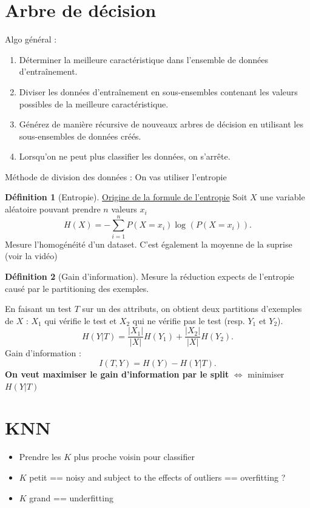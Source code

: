 \documentclass{article}
\theoremstyle{plain}%
\theoremstyle{definition}
\newtheorem{defn}{Définition}[section]
\theoremstyle{remark}
\begin{document}
\section{Arbre de décision}
Algo général : 
\begin{enumerate}
    \item Déterminer la meilleure caractéristique dans l'ensemble de données d'entraînement.
    \item Diviser les données d'entraînement en sous-ensembles contenant les valeurs possibles de la meilleure caractéristique.
    \item Générez de manière récursive de nouveaux arbres de décision en utilisant les sous-ensembles de données créés.
    \item Lorsqu'on ne peut plus classifier les données, on s'arrête.
\end{enumerate}
Méthode de division des données : On vas utiliser l'entropie 
\begin{defn}[Entropie]   
    \href{https://www.youtube.com/watch?v=YtebGVx-Fxw}{Origine de la formule de l'entropie}
    Soit $ X $ une variable aléatoire pouvant prendre $ n $ valeurs $ x_i $ 
    \[
        H(X) = - \sum_{i=1}^{n}P(X = x_i)\log_{} (P(X = x_i))
    .\]
    Mesure l'homogénéité d'un dataset. C'est également la moyenne de la suprise (voir la vidéo)
\end{defn}
\begin{defn}[Gain d'information]
    Mesure la réduction expects de l'entropie causé par le partitioning des exemples.

    En faisant un test $T$ sur un des attributs, on obtient deux partitions d'exemples de $X$ : $X_1$ qui vérifie le test et $X_2$ qui ne vérifie pas le test (resp. $Y_1$ et $Y_2$).
    \[
        H(Y|T) = \frac{\left| X_1 \right| }{\left| X \right| } H(Y_1) + \frac{\left| X_2 \right| }{\left| X \right| } H(Y_2)
    .\]
    Gain d'information : 
    \[
        I(T, Y) = H(Y) - H(Y|T)
    .\]
    \textbf{On veut maximiser le gain d'information par le split} $ \Leftrightarrow $ minimiser $ H(Y|T) $ 
\end{defn}

\section{KNN}
\begin{itemize}
    \item Prendre les $ K $ plus proche voisin pour classifier 
    \item $ K $ petit == noisy and subject to the effects of outliers == overfitting ? 
    \item $ K $ grand == underfitting
\end{itemize}
\end{document}
